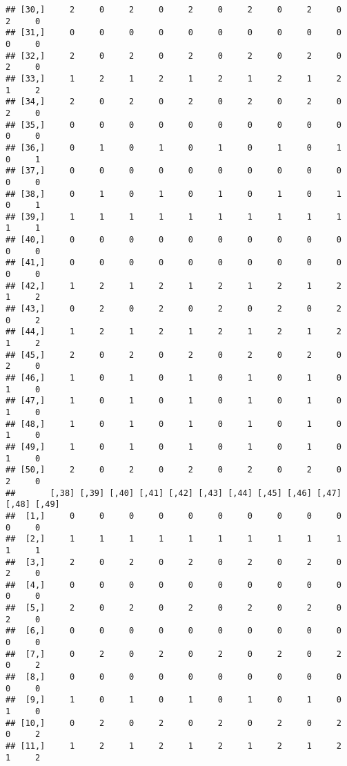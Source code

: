 \documentclass[
]{article}
\begin{document}
\begin{verbatim}
## [30,]     2     0     2     0     2     0     2     0     2     0     2     0
## [31,]     0     0     0     0     0     0     0     0     0     0     0     0
## [32,]     2     0     2     0     2     0     2     0     2     0     2     0
## [33,]     1     2     1     2     1     2     1     2     1     2     1     2
## [34,]     2     0     2     0     2     0     2     0     2     0     2     0
## [35,]     0     0     0     0     0     0     0     0     0     0     0     0
## [36,]     0     1     0     1     0     1     0     1     0     1     0     1
## [37,]     0     0     0     0     0     0     0     0     0     0     0     0
## [38,]     0     1     0     1     0     1     0     1     0     1     0     1
## [39,]     1     1     1     1     1     1     1     1     1     1     1     1
## [40,]     0     0     0     0     0     0     0     0     0     0     0     0
## [41,]     0     0     0     0     0     0     0     0     0     0     0     0
## [42,]     1     2     1     2     1     2     1     2     1     2     1     2
## [43,]     0     2     0     2     0     2     0     2     0     2     0     2
## [44,]     1     2     1     2     1     2     1     2     1     2     1     2
## [45,]     2     0     2     0     2     0     2     0     2     0     2     0
## [46,]     1     0     1     0     1     0     1     0     1     0     1     0
## [47,]     1     0     1     0     1     0     1     0     1     0     1     0
## [48,]     1     0     1     0     1     0     1     0     1     0     1     0
## [49,]     1     0     1     0     1     0     1     0     1     0     1     0
## [50,]     2     0     2     0     2     0     2     0     2     0     2     0
##       [,38] [,39] [,40] [,41] [,42] [,43] [,44] [,45] [,46] [,47] [,48] [,49]
##  [1,]     0     0     0     0     0     0     0     0     0     0     0     0
##  [2,]     1     1     1     1     1     1     1     1     1     1     1     1
##  [3,]     2     0     2     0     2     0     2     0     2     0     2     0
##  [4,]     0     0     0     0     0     0     0     0     0     0     0     0
##  [5,]     2     0     2     0     2     0     2     0     2     0     2     0
##  [6,]     0     0     0     0     0     0     0     0     0     0     0     0
##  [7,]     0     2     0     2     0     2     0     2     0     2     0     2
##  [8,]     0     0     0     0     0     0     0     0     0     0     0     0
##  [9,]     1     0     1     0     1     0     1     0     1     0     1     0
## [10,]     0     2     0     2     0     2     0     2     0     2     0     2
## [11,]     1     2     1     2     1     2     1     2     1     2     1     2

\end{verbatim}
\end{document}
